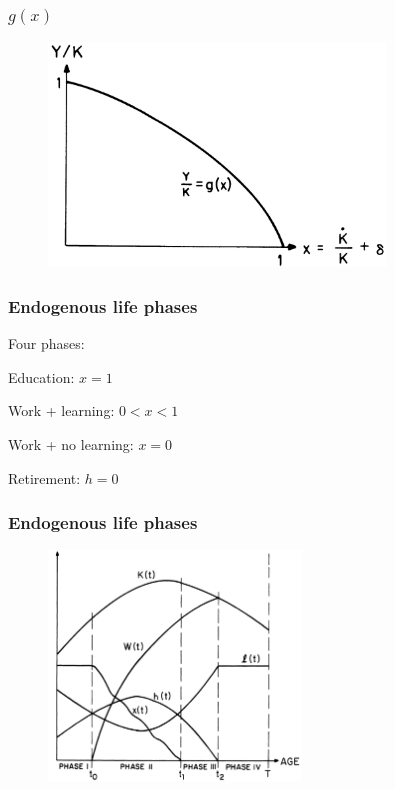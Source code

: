 \documentclass[aspectratio=169]{beamer}
\newenvironment{wideitemize}{\itemize\addtolength{\itemsep}{10pt}}{\enditemize}
\begin{document}
\begin{frame}
    \frametitle{$g(x)$}
    
    \begin{figure}[t]
        \includegraphics[width=0.8\textwidth]{../output/g.png}
        \centering
    \end{figure}

\end{frame}



\begin{frame}
    \frametitle{Endogenous life phases}
    
    Four phases:
    \begin{wideitemize}
        \item Education: $x = 1$
        \item Work + learning: $0 < x < 1$
        \item Work + no learning: $x = 0$
        \item Retirement: $h = 0$
    \end{wideitemize}

\end{frame}

\begin{frame}
    \frametitle{Endogenous life phases}

    \begin{figure}[t]
        \includegraphics[width=0.6\textwidth]{../output/phases.png}
        \centering
    \end{figure}

\end{frame}
\end{document}
